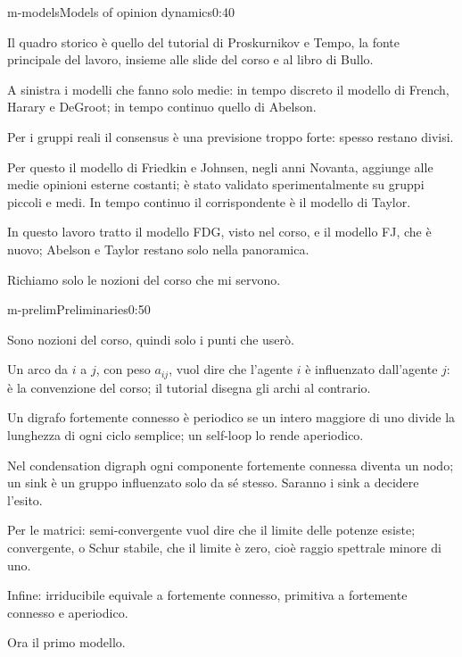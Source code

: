 \begin{slide}{m-models}{Models of opinion dynamics}{0:40}
  \begin{discorso}
    \item Il quadro storico è quello del tutorial di Proskurnikov e Tempo, la fonte principale del lavoro, insieme alle slide del corso e al libro di Bullo.
    \item A sinistra i modelli che fanno solo medie: in tempo discreto il modello di French, Harary e DeGroot; in tempo continuo quello di Abelson.
    \item Per i gruppi reali il consensus è una previsione troppo forte: spesso restano divisi.
    \item Per questo il modello di Friedkin e Johnsen, negli anni Novanta, aggiunge alle medie opinioni esterne costanti; è stato validato sperimentalmente su gruppi piccoli e medi. In tempo continuo il corrispondente è il modello di Taylor.
    \item In questo lavoro tratto il modello FDG, visto nel corso, e il modello FJ, che è nuovo; Abelson e Taylor restano solo nella panoramica.
    \item Richiamo solo le nozioni del corso che mi servono.
  \end{discorso}
\end{slide}

\begin{slide}{m-prelim}{Preliminaries}{0:50}
  \begin{discorso}
    \item Sono nozioni del corso, quindi solo i punti che userò.
    \item Un arco da $i$ a $j$, con peso $a_{ij}$, vuol dire che l'agente $i$ è influenzato dall'agente $j$: è la convenzione del corso; il tutorial disegna gli archi al contrario.
    \item Un digrafo fortemente connesso è periodico se un intero maggiore di uno divide la lunghezza di ogni ciclo semplice; un self-loop lo rende aperiodico.
    \item Nel condensation digraph ogni componente fortemente connessa diventa un nodo; un sink è un gruppo influenzato solo da sé stesso. Saranno i sink a decidere l'esito.
    \item Per le matrici: semi-convergente vuol dire che il limite delle potenze esiste; convergente, o Schur stabile, che il limite è zero, cioè raggio spettrale minore di uno.
    \item Infine: irriducibile equivale a fortemente connesso, primitiva a fortemente connesso e aperiodico.
    \item Ora il primo modello.
  \end{discorso}
\end{slide}

